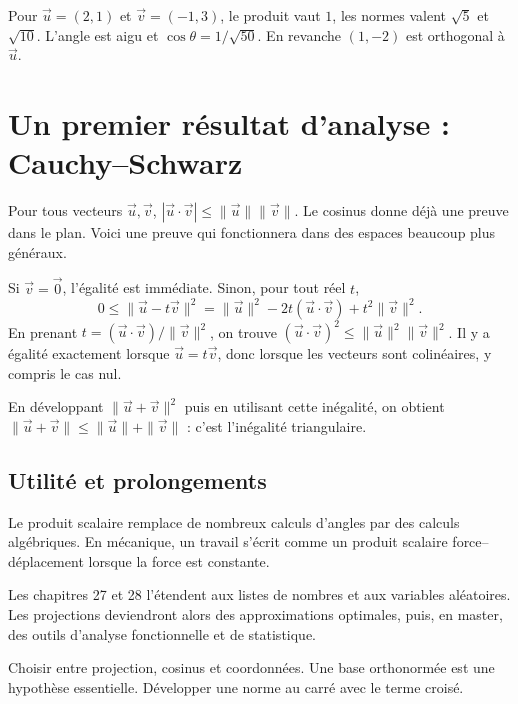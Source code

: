 \documentclass[../cours_1re.tex]{subfiles}
\begin{document}
\begin{exemple}
Pour $\vec u=(2,1)$ et $\vec v=(-1,3)$, le produit vaut $1$, les normes
valent $\sqrt5$ et $\sqrt{10}$. L'angle est aigu et
$\cos\theta=1/\sqrt{50}$. En revanche $(1,-2)$ est orthogonal à $\vec u$.
\end{exemple}

\section{Un premier résultat d'analyse : Cauchy--Schwarz}
\approfondissement
Pour tous vecteurs $\vec u,\vec v$,
$|\vec u\cdot\vec v|\le\|\vec u\|\|\vec v\|$.
Le cosinus donne déjà une preuve dans le plan. Voici une preuve qui
fonctionnera dans des espaces beaucoup plus généraux.
\begin{demonstration}
Si $\vec v=\vec0$, l'égalité est immédiate. Sinon, pour tout réel $t$,
\[
0\le\|\vec u-t\vec v\|^2
=\|\vec u\|^2-2t(\vec u\cdot\vec v)+t^2\|\vec v\|^2.
\]
En prenant $t=(\vec u\cdot\vec v)/\|\vec v\|^2$, on trouve
$(\vec u\cdot\vec v)^2\le\|\vec u\|^2\|\vec v\|^2$.
Il y a égalité exactement lorsque $\vec u=t\vec v$, donc lorsque
les vecteurs sont colinéaires, y compris le cas nul.
\end{demonstration}
En développant $\|\vec u+\vec v\|^2$ puis en utilisant cette inégalité,
on obtient $\|\vec u+\vec v\|\le\|\vec u\|+\|\vec v\|$ :
c'est l'inégalité triangulaire.

\begin{finchapitre}
\section{Utilité et prolongements}
Le produit scalaire remplace de nombreux calculs d'angles par des calculs
algébriques. En mécanique, un travail s'écrit comme un produit scalaire
force--déplacement lorsque la force est constante.

Les chapitres 27 et 28 l'étendent aux listes de nombres et aux variables aléatoires.
Les projections deviendront alors des approximations optimales, puis, en master,
des outils d'analyse fonctionnelle et de statistique.
\begin{retenir}
Choisir entre projection, cosinus et coordonnées. Une base orthonormée
est une hypothèse essentielle. Développer une norme au carré avec le terme croisé.
\end{retenir}
\end{finchapitre}
\end{document}
